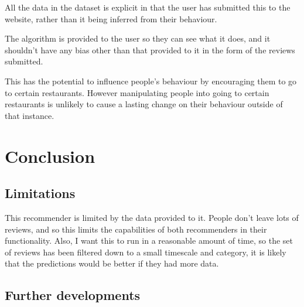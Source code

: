 \documentclass[conference]{IEEEtran}
\begin{document}
All the data in the dataset is explicit in that the user has submitted this to the website, rather than it being inferred from their behaviour.

The algorithm is provided to the user so they can see what it does, and it shouldn't have any bias other than that provided to it in the form of the reviews submitted.

This has the potential to influence people's behaviour by encouraging them to go to certain restaurants. However manipulating people into going to certain restaurants is unlikely to cause a lasting change on their behaviour outside of that instance.



\section{Conclusion}

\subsection{Limitations}

This recommender is limited by the data provided to it. People don't leave lots of reviews, and so this limits the capabilities of both recommenders in their functionality. Also, I want this to run in a reasonable amount of time, so the set of reviews has been filtered down to a small timescale and category, it is likely that the predictions would be better if they had more data.

\subsection{Further developments}




\end{document}
